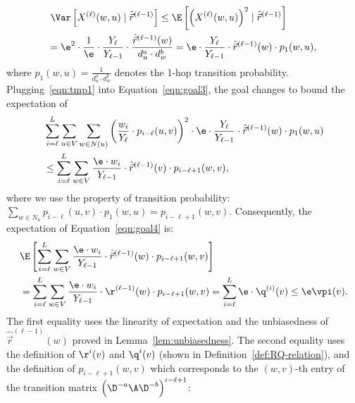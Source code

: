 \vspace{-3mm}
\begin{equation}\label{eqn:tmp1}
\vspace{-1mm}
\begin{aligned}
&\Var \left[X^{(\ell)}(w,u) \mid \hat{\vec{r}}^{(\ell-1)} \right] 
\le \E \left[ \left(X^{(\ell)}(w,u)  \right)^2 \mid \hat{\vec{r}}^{(\ell-1)} \right]\\
&\hspace{-1mm}=\e^2 \cdot \frac{1}{\e} \cdot \frac{Y_{\ell}}{Y_{\ell-1}} \cdot \frac{\hat{\vec{r}}^{(\ell-1)}(w)}{d_u^a\cdot d_w^b}
=\e \cdot \frac{Y_{\ell}}{Y_{\ell-1}} \cdot \hat{\vec{r}}^{(\ell-1)}(w) \cdot p_1(w,u), 
\end{aligned}
\end{equation}
where $p_1(w,u)=\frac{1}{d_u^a\cdot d_w^b}$ denotes the 1-hop transition probability. Plugging~\eqref{eqn:tmp1} into Equation~\eqref{eqn:goal3}, the goal changes to bound the expectation of
\vspace{-2mm}
\begin{equation}\label{eqn:goal4}
\begin{aligned}
&\sum_{i=\ell}^{L}\sum_{u \in V} \sum_{w \in N(u)}\left(\frac{w_i}{Y_{\ell}}\cdot p_{i-\ell}(u,v) \right)^2\cdot \e \cdot \frac{Y_{\ell}}{Y_{\ell-1}} \cdot \hat{\vec{r}}^{(\ell-1)}(w) \cdot p_1(w,u)\\
&\le \sum_{i=\ell}^{L}\sum_{w \in V} \frac{\e\cdot w_i}{Y_{\ell-1}}\cdot \hat{\vec{r}}^{(\ell-1)}(v)\cdot p_{i-\ell+1}(w,v), 
\end{aligned}
\end{equation}
where we use the property of transition probability: $\sum_{w\in N_u} p_{i-\ell}(u,v)\cdot p_1(w,u)=p_{i-\ell+1}(w,v)$. Consequently, the expectation of Equation~\eqref{eqn:goal4} is: 
\vspace{-2mm}
\begin{equation}\label{eqn:goal5}
\begin{aligned}
&\E \left[\sum_{i=\ell}^{L}\sum_{w \in V} \frac{\e\cdot w_i}{Y_{\ell-1}}\cdot \hat{\vec{r}}^{(\ell-1)}(w) \cdot p_{i-\ell+1}(w,v)\right]\\
&=\sum_{i=\ell}^{L}\sum_{w \in V} \frac{\e\cdot w_i}{Y_{\ell-1}}\cdot \r^{(\ell-1)}(w)\cdot p_{i-\ell+1}(w,v)
=\sum_{i=\ell}^{L} \e \cdot \q^{(i)}(v) \le \e \vpi(v).  
\end{aligned}
\end{equation}
The first equality uses the linearity of expectation and the unbiasedness of $\hat{\vec{r}}^{(\ell-1)}(w)$ proved in Lemma~\ref{lem:unbiasedness}. The second equality uses the definition of $\r^{i}(v)$ and $\q^{i}(v)$ (shown in Definition~\ref{def:RQ-relation}), and the definition of $p_{i-\ell+1}(w,v)$ which corresponds to the $(w,v)$-th entry of the transition matrix $\left( \D^{-a} \A \D^{-b}\right)^{i-\ell+1}$: 
